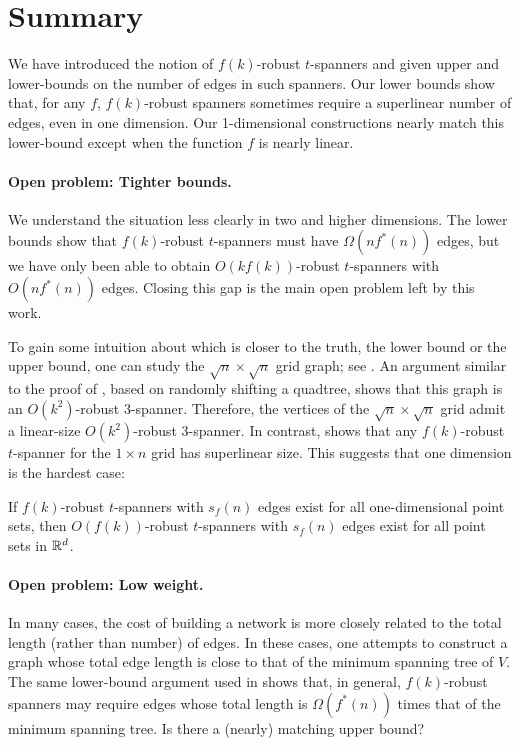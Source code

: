 \documentclass{patmorin}
\begin{document}
\section{Summary}

We have introduced the notion of $f(k)$-robust $t$-spanners and given
upper and lower-bounds on the number of edges in such spanners.  Our lower
bounds show that, for any $f$, $f(k)$-robust spanners sometimes require
a superlinear number of edges, even in one dimension.  Our 1-dimensional
constructions nearly match this lower-bound except when the function
$f$ is nearly linear.

\paragraph{Open problem: Tighter bounds.}
We understand the situation less clearly in two and higher dimensions.
The lower bounds show that $f(k)$-robust $t$-spanners must have
$\Omega(nf^*(n))$ edges, but we have only been able to obtain
$O(kf(k))$-robust $t$-spanners with $O(nf^*(n))$ edges.  Closing this
gap is the main open problem left by this work.

To gain some intuition about which is closer to the truth, the lower
bound or the upper bound, one can study the $\sqrt{n}\times\sqrt{n}$
grid graph; see .  An argument similar to the proof of
, based on randomly shifting a quadtree, shows that
this graph is an $O(k^2)$-robust $3$-spanner.  Therefore, the vertices
of the $\sqrt{n}\times\sqrt{n}$ grid admit a linear-size $O(k^2)$-robust
3-spanner.  In contrast,  shows that any
$f(k)$-robust $t$-spanner for the $1\times n$ grid has superlinear size.
This suggests that one dimension is the hardest case:

\begin{conj}
If $f(k)$-robust $t$-spanners with $s_f(n)$ edges exist for all one-dimensional point sets, then $O(f(k))$-robust $t$-spanners with $s_f(n)$ edges exist for all point sets in $\mathbb{R}^d$.
\end{conj}


\paragraph{Open problem: Low weight.}

In many cases, the cost of building a network is more closely related to
the total length (rather than number) of edges.  In these cases, one
attempts to construct a graph whose total edge length is close to that
of the minimum spanning tree of $V$. The same lower-bound argument used
in  shows that, in general, $f(k)$-robust
spanners may require edges whose total length is $\Omega(f^*(n))$ times
that of the minimum spanning tree.  Is there a (nearly) matching upper bound?
\end{document}
